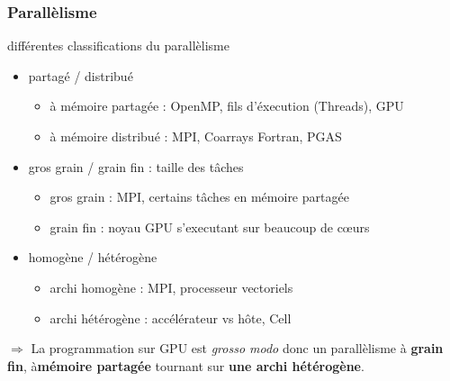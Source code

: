 \documentclass[11pt,mathserif]{beamer}
\begin{document}
\begin{frame}
\frametitle{Parallèlisme}
\pause
différentes classifications du parallèlisme
\begin{itemize}[<+->]
  \item partagé / distribué
    \begin{itemize}
      \item à mémoire partagée : OpenMP, fils d'éxecution (Threads), GPU 
      \item à mémoire distribué : MPI, Coarrays Fortran, PGAS
    \end{itemize}
 \item gros grain / grain fin : taille des tâches
   \begin{itemize}
     \item gros grain : MPI, certains tâches en mémoire partagée
     \item grain fin : noyau GPU s'executant sur beaucoup de cœurs
   \end{itemize}
 \item homogène / hétérogène 
   \begin{itemize}
     \item archi homogène : MPI, processeur vectoriels
     \item archi hétérogène : accélérateur vs hôte, Cell 
   \end{itemize}
\end{itemize}
\pause
  $\Rightarrow$ La programmation sur GPU est {\it grosso modo } donc un parallèlisme à {\bf grain fin}, à{\bf mémoire partagée} tournant sur 
  {\bf une archi hétérogène}.
\end{frame}
\end{document}
